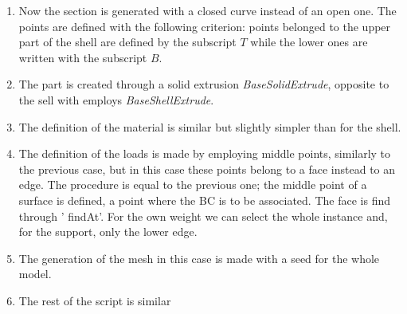 \documentclass[english,a4paper,12pt]{article}
\begin{document}
\begin{enumerate}
\item

Now the section is generated with a closed curve instead of an open one. The points are defined with the following criterion: points belonged to the upper part of the shell are defined by the subscript $T$ while the lower ones are written with the subscript $B$.
\item

The part is created through a solid extrusion \textit{BaseSolidExtrude}, opposite to the sell with employs \emph{BaseShellExtrude}.
\item

The definition of the material is similar but slightly simpler than for the shell.
\item

The definition of the loads is made by employing middle points, similarly to the previous case, but in this case these points belong to a face instead to an edge. The procedure is equal to the previous one; the middle point of a surface is defined, a point where the BC is to be associated. The face is find through ' findAt'. For the own weight we can select the whole instance and, for the support, only the lower edge.
\item
The generation of the mesh in this case is made with a seed for the whole model.
\item
The rest of the script is similar
\end{enumerate}
\end{document}
